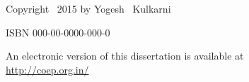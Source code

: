 \begin{titlepage}
\medskip



\noindent

\vspace{33\bigskipamount}

\noindent Copyright \textcopyright\ 2015 by Yogesh ~Kulkarni


\medskip
\noindent ISBN 000-00-0000-000-0

\medskip
\noindent An electronic version of this dissertation is available at \\
\url{http://coep.org.in/}

\end{titlepage}

